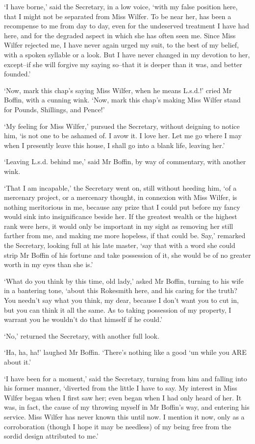 ‘I have borne,’ said the Secretary, in a low voice, ‘with my false
position here, that I might not be separated from Miss Wilfer. To be
near her, has been a recompense to me from day to day, even for the
undeserved treatment I have had here, and for the degraded aspect in
which she has often seen me. Since Miss Wilfer rejected me, I have never
again urged my suit, to the best of my belief, with a spoken syllable or
a look. But I have never changed in my devotion to her, except--if she
will forgive my saying so--that it is deeper than it was, and better
founded.’

‘Now, mark this chap’s saying Miss Wilfer, when he means L.s.d.!’ cried
Mr Boffin, with a cunning wink. ‘Now, mark this chap’s making Miss
Wilfer stand for Pounds, Shillings, and Pence!’

‘My feeling for Miss Wilfer,’ pursued the Secretary, without deigning to
notice him, ‘is not one to be ashamed of. I avow it. I love her. Let
me go where I may when I presently leave this house, I shall go into a
blank life, leaving her.’

‘Leaving L.s.d. behind me,’ said Mr Boffin, by way of commentary, with
another wink.

‘That I am incapable,’ the Secretary went on, still without heeding him,
‘of a mercenary project, or a mercenary thought, in connexion with Miss
Wilfer, is nothing meritorious in me, because any prize that I could
put before my fancy would sink into insignificance beside her. If
the greatest wealth or the highest rank were hers, it would only be
important in my sight as removing her still farther from me, and making
me more hopeless, if that could be. Say,’ remarked the Secretary,
looking full at his late master, ‘say that with a word she could strip
Mr Boffin of his fortune and take possession of it, she would be of no
greater worth in my eyes than she is.’

‘What do you think by this time, old lady,’ asked Mr Boffin, turning to
his wife in a bantering tone, ‘about this Rokesmith here, and his caring
for the truth? You needn’t say what you think, my dear, because I don’t
want you to cut in, but you can think it all the same. As to taking
possession of my property, I warrant you he wouldn’t do that himself if
he could.’

‘No,’ returned the Secretary, with another full look.

‘Ha, ha, ha!’ laughed Mr Boffin. ‘There’s nothing like a good ‘un while
you ARE about it.’

‘I have been for a moment,’ said the Secretary, turning from him and
falling into his former manner, ‘diverted from the little I have to say.
My interest in Miss Wilfer began when I first saw her; even began when I
had only heard of her. It was, in fact, the cause of my throwing myself
in Mr Boffin’s way, and entering his service. Miss Wilfer has never
known this until now. I mention it now, only as a corroboration (though
I hope it may be needless) of my being free from the sordid design
attributed to me.’

